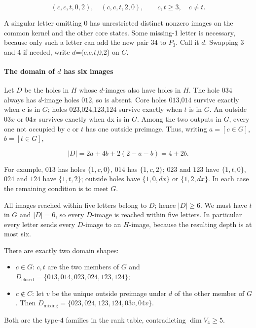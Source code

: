 \documentclass[11pt]{article}
\theoremstyle{definition}
\theoremstyle{plain}
\begin{document}
\[
(c,c,t,0,2),\quad(c,c,t,2,0),\qquad c,t\ge3,\quad c\ne t.
\]

A singular letter omitting 0 has unrestricted distinct nonzero
images on the common kernel and the other core states. Some missing-1
letter is necessary, because only such a letter can add the new pair
\(34\) to \(P_{3}\). Call it \(d\). Swapping 3 and 4 if needed, write
\(d\)=(c,c,\(t\),0,2) on \(C\).

\paragraph{The domain of \(d\) has six
images}\label{the-domain-of-d-has-six-images}

Let \(D\) be the holes in \(H\) whose \(d\)-images also have holes in
\(H\). The hole \(034\) always has \(d\)-image holes \(012\), so is absent. Core
holes \(013\),\(014\) survive exactly when c is in \(G\); holes \(023\),\(024\),\(123\),\(124\)
survive exactly when \(t\) is in \(G\). An outside \(03x\) or \(04x\)
survives exactly when dx is in \(G\). Among the two outputs in \(G\),
every one not occupied by c or \(t\) has one outside preimage. Thus,
writing \(a=[c\in G]\), \(b=[t\in G]\),

\[
|D|=2a+4b+2(2-a-b)=4+2b.
\]

For example, \(013\) has holes \(\{1,c,0\}\), \(014\) has \(\{1,c,2\}\);
\(023\) and \(123\) have \(\{1,t,0\}\), \(024\) and \(124\) have \(\{1,t,2\}\); outside
holes have \(\{1,0,dx\}\) or \(\{1,2,dx\}\). In each case the remaining
condition is to meet \(G\).

All images reached within five letters belong to \(D\); hence
\(|D|\ge 6\). We must have \(t\) in \(G\) and \(|D|=6\), so every
\(D\)-image is reached within five letters. In particular every letter
sends every \(D\)-image to an \(H\)-image, because the resulting depth
is at most six.

There are exactly two domain shapes:

\begin{itemize}
\item
  \(c\in G\): \(c,t\) are the two members of \(G\) and
  \(D_{\mathrm{closed}}=\{013,014,023,024,123,124\}\);
\item
  \(c\notin C\): let \(v\) be the unique outside preimage under \(d\)
  of the other member of \(G\). Then
  \(D_{\mathrm{mixing}}=\{023,024,123,124,03v,04v\}\).
\end{itemize}

Both are the type-4 families in the rank table, contradicting \(\dim V_4\ge5\).
\end{document}

